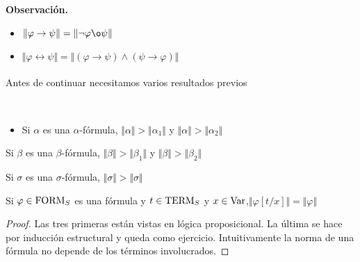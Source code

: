 \textbf{Observación.}
\begin{itemize}
\item $\Vert\varphi\rightarrow\psi\Vert = \Vert\neg\varphi\o\psi\Vert$
\item $\Vert\varphi\leftrightarrow\psi\Vert = \Vert(\varphi\rightarrow\psi)\wedge(\psi\rightarrow\varphi)\Vert$
\end{itemize}
\paragraph{}
Antes de continuar necesitamos varios resultados previos
\begin{lemma}\mbox{ }
  \begin{itemize}
  \item Si $\alpha$ es una $\alpha$-fórmula, $\Vert\alpha\Vert>\Vert\alpha_{1}\Vert$ y $\Vert\alpha\Vert>\Vert\alpha_{2}\Vert$
  \end{itemize}
  \item Si $\beta$ es una $\beta$-fórmula, $\Vert\beta\Vert>\Vert\beta_{1}\Vert$ y $\Vert\beta\Vert>\Vert\beta_{2}\Vert$
  \item Si $\sigma$ es una $\sigma$-fórmula, $\Vert\sigma\Vert>\Vert\sigma\Vert$
  \item Si $\varphi\in\mbox{FORM}_{S}$ es una fórmula y $t\in\mbox{TERM}_{S}$ y  $x\in\mbox{Var}$,$\Vert\varphi[t/x]\Vert=\Vert\varphi\Vert$
  \begin{proof}
    Las tres primeras están vistas en lógica proposicional. La última se hace por inducción estructural y queda como ejercicio. Intuitivamente la norma de una fórmula no depende de los términos involucrados.
  \end{proof}
  \end{lemma}

